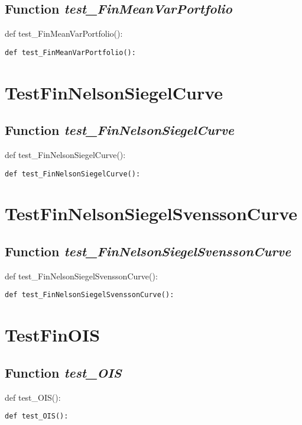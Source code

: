 \documentclass[twoside,11pt]{book}
\begin{document}
\subsection{Function {\it test\_FinMeanVarPortfolio}}
def test\_FinMeanVarPortfolio():

\begin{lstlisting}
def test_FinMeanVarPortfolio():
\end{lstlisting}


\newpage
\section{TestFinNelsonSiegelCurve}

\subsection{Function {\it test\_FinNelsonSiegelCurve}}
def test\_FinNelsonSiegelCurve():

\begin{lstlisting}
def test_FinNelsonSiegelCurve():
\end{lstlisting}


\newpage
\section{TestFinNelsonSiegelSvenssonCurve}

\subsection{Function {\it test\_FinNelsonSiegelSvenssonCurve}}
def test\_FinNelsonSiegelSvenssonCurve():

\begin{lstlisting}
def test_FinNelsonSiegelSvenssonCurve():
\end{lstlisting}


\newpage
\section{TestFinOIS}

\subsection{Function {\it test\_OIS}}
def test\_OIS():

\begin{lstlisting}
def test_OIS():
\end{lstlisting}
\end{document}
